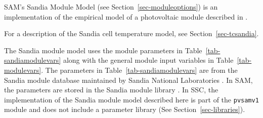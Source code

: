 \documentclass[12pt,letterpaper]{article}
\begin{document}
SAM's Sandia Module Model (see Section~\ref{sec-moduleoptions}) is an implementation of the empirical model of a photovoltaic module described in \citet{king2004}. 

For a description of the Sandia cell temperature model, see Section~\ref{sec-tcsandia}.

The Sandia module model uses the module parameters in Table~\ref{tab-sandiamodulevars} along with the general module input variables in Table~\ref{tab-modulevars}. The parameters in Table~\ref{tab-sandiamodulevars} are from the Sandia module database maintained by Sandia National Laboratories \citep{sandia-testeval}.  In SAM, the parameters are stored in the Sandia module library \citep{help-libraries}. In SSC, the implementation of the Sandia module model described here is part of the \texttt{pvsamv1} module and does not include a parameter library (See Section~\ref{sec-libraries}).

\end{document}
